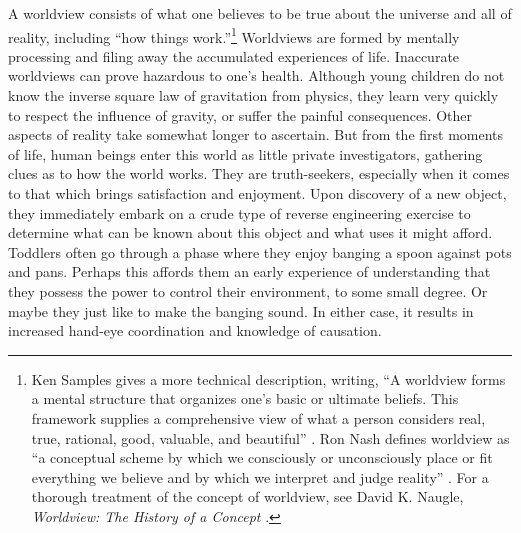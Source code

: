 A worldview consists of what one believes to be true about the universe
and all of reality, including “how things work.”\footnote{Ken Samples gives a more technical description,
writing, “A worldview forms a mental structure that organizes one’s
basic or ultimate beliefs. This framework supplies a comprehensive view
of what a person considers real, true, rational, good, valuable, and
beautiful” \citep[][p.~20]{samples2007}.
Ron Nash defines worldview as “a conceptual scheme by
which we consciously or unconsciously place or fit everything we
believe and by which we interpret and judge reality” \citep[][p.~24]{nash1988}.
For a thorough treatment of the concept
of worldview, see David K. Naugle, \textit{Worldview: The History of a
Concept} \citep{naugle2002}.
} 
Worldviews are formed by mentally processing and filing away the
accumulated experiences of life. Inaccurate worldviews can prove
hazardous to one’s health. Although young children do not know the
inverse square law of gravitation from physics, they learn very quickly
to respect the influence of gravity, or suffer the painful
consequences. Other aspects of reality take somewhat longer to
ascertain. But from the first moments of life, human beings enter this
world as little private investigators, gathering clues as to how the world
works. They are truth-seekers, especially when it comes to that which
brings satisfaction and enjoyment. Upon discovery of a new object, they
immediately embark on a crude type of reverse engineering exercise to
determine what can be known about this object and what uses it might
afford. Toddlers often go through a phase where they enjoy banging a
spoon against pots and pans. Perhaps this affords them an early
experience of understanding that they possess the power to control
their environment, to some small degree. Or maybe they just like to
make the banging sound. In either case, it results in increased
hand-eye coordination and knowledge of causation.

